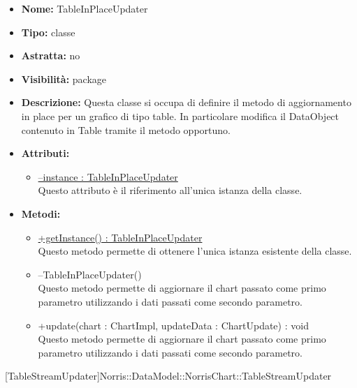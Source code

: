 			
			\begin{itemize}
			\item \textbf{Nome:} TableInPlaceUpdater
			\item \textbf{Tipo:} classe
			
		\item \textbf{Astratta:}
		no
			\item \textbf{Visibilità:} package
			\item \textbf{Descrizione:} Questa classe si occupa di definire il metodo di aggiornamento in place per un grafico di tipo table. In particolare modifica il DataObject contenuto in Table tramite il metodo opportuno.
			\item \textbf{Attributi:}
				\begin{itemize}
				\setlength{\itemsep}{5pt}
				
					\item[\ding{111}] \underline{--instance : TableInPlaceUpdater} \\ [1mm] Questo attributo è il riferimento all'unica istanza della classe.
				\end{itemize}
		
			\item \textbf{Metodi:}
				\begin{itemize}
				\setlength{\itemsep}{5pt}
				
					\item[\ding{111}] {\underline{+getInstance() : TableInPlaceUpdater}} \\ [1mm] Questo metodo permette di ottenere l'unica istanza esistente della classe.
					\item[\ding{111}] {{--TableInPlaceUpdater()}} \\ [1mm] Questo metodo permette di aggiornare il chart passato come primo parametro utilizzando i dati passati come secondo parametro.
					\item[\ding{111}] {{+update(chart : ChartImpl, updateData : ChartUpdate) : void}} \\ [1mm] Questo metodo permette di aggiornare il chart passato come primo parametro utilizzando i dati passati come secondo parametro.
				\end{itemize}
		
			\end{itemize}

			
			[TableStreamUpdater]{Norris::DataModel::NorrisChart::TableStreamUpdater}
			

